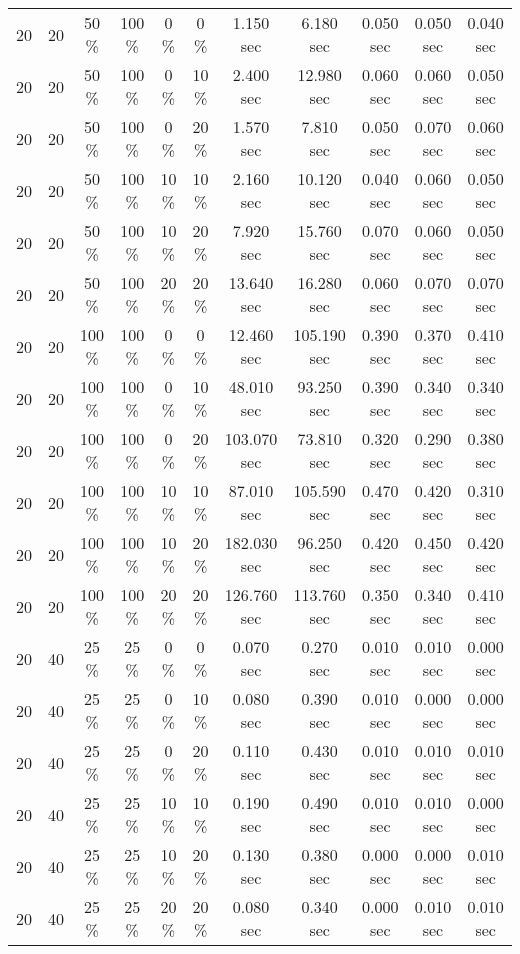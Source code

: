 \documentclass{article}
\begin{document}
\begin{longtable}[]{@{}ccccccccccc@{}}
20 & 20 & 50 \% & 100 \% & 0 \% & 0 \% & 1.150 sec & 6.180 sec & 0.050 sec & 0.050 sec & 0.040 sec \\
20 & 20 & 50 \% & 100 \% & 0 \% & 10 \% & 2.400 sec & 12.980 sec & 0.060 sec & 0.060 sec & 0.050 sec \\
20 & 20 & 50 \% & 100 \% & 0 \% & 20 \% & 1.570 sec & 7.810 sec & 0.050 sec & 0.070 sec & 0.060 sec \\
20 & 20 & 50 \% & 100 \% & 10 \% & 10 \% & 2.160 sec & 10.120 sec & 0.040 sec & 0.060 sec & 0.050 sec \\
20 & 20 & 50 \% & 100 \% & 10 \% & 20 \% & 7.920 sec & 15.760 sec & 0.070 sec & 0.060 sec & 0.050 sec \\
20 & 20 & 50 \% & 100 \% & 20 \% & 20 \% & 13.640 sec & 16.280 sec & 0.060 sec & 0.070 sec & 0.070 sec \\
20 & 20 & 100 \% & 100 \% & 0 \% & 0 \% & 12.460 sec & 105.190 sec & 0.390 sec & 0.370 sec & 0.410 sec \\
20 & 20 & 100 \% & 100 \% & 0 \% & 10 \% & 48.010 sec & 93.250 sec & 0.390 sec & 0.340 sec & 0.340 sec \\
20 & 20 & 100 \% & 100 \% & 0 \% & 20 \% & 103.070 sec & 73.810 sec & 0.320 sec & 0.290 sec & 0.380 sec \\
20 & 20 & 100 \% & 100 \% & 10 \% & 10 \% & 87.010 sec & 105.590 sec & 0.470 sec & 0.420 sec & 0.310 sec \\
20 & 20 & 100 \% & 100 \% & 10 \% & 20 \% & 182.030 sec & 96.250 sec & 0.420 sec & 0.450 sec & 0.420 sec \\
20 & 20 & 100 \% & 100 \% & 20 \% & 20 \% & 126.760 sec & 113.760 sec & 0.350 sec & 0.340 sec & 0.410 sec \\
20 & 40 & 25 \% & 25 \% & 0 \% & 0 \% & 0.070 sec & 0.270 sec & 0.010 sec & 0.010 sec & 0.000 sec \\
20 & 40 & 25 \% & 25 \% & 0 \% & 10 \% & 0.080 sec & 0.390 sec & 0.010 sec & 0.000 sec & 0.000 sec \\
20 & 40 & 25 \% & 25 \% & 0 \% & 20 \% & 0.110 sec & 0.430 sec & 0.010 sec & 0.010 sec & 0.010 sec \\
20 & 40 & 25 \% & 25 \% & 10 \% & 10 \% & 0.190 sec & 0.490 sec & 0.010 sec & 0.010 sec & 0.000 sec \\
20 & 40 & 25 \% & 25 \% & 10 \% & 20 \% & 0.130 sec & 0.380 sec & 0.000 sec & 0.000 sec & 0.010 sec \\
20 & 40 & 25 \% & 25 \% & 20 \% & 20 \% & 0.080 sec & 0.340 sec & 0.000 sec & 0.010 sec & 0.010 sec \\

\end{longtable}
\end{document}
